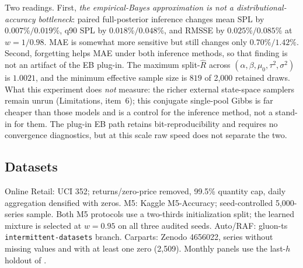 \documentclass[twocolumn,10pt]{article}
\theoremstyle{definition}
\begin{document}
Two readings. First, \emph{the empirical-Bayes approximation is not a
distributional-accuracy bottleneck}: paired full-posterior inference changes
mean SPL by $0.007\%/0.019\%$, q90 SPL by $0.018\%/0.048\%$, and RMSSE by
$0.025\%/0.085\%$ at $w=1/0.98$. MAE is somewhat more sensitive but still
changes only $0.70\%/1.42\%$. Second, forgetting helps MAE under both
inference methods, so that finding is not an artifact of the EB plug-in.
The maximum split-$\widehat R$ across $(\alpha,\beta,\mu_0,\tau^2,\sigma^2)$
is $1.0021$, and the minimum effective sample size is $819$ of 2{,}000
retained draws.
What this experiment does \emph{not} measure: the richer external
state-space samplers
\citep{chapados2014,seeger2016} remain unrun (Limitations, item~6); this
conjugate single-pool Gibbs is far cheaper than those models and is a
control for the inference method, not a stand-in for them. The plug-in
EB path retains bit-reproducibility and requires no convergence
diagnostics, but at this scale raw speed does not separate the two.

\subsection{Datasets}\label{app:datasets}
Online Retail: UCI 352; returns/zero-price removed, 99.5\% quantity cap,
daily aggregation densified with zeros. M5: Kaggle M5-Accuracy;
seed-controlled 5{,}000-series sample. Both M5 protocols use a two-thirds
initialization split; the learned mixture is selected at $w=0.95$ on all
three audited seeds. Auto/RAF: gluon-ts
\texttt{intermittent-datasets} branch. Carparts: Zenodo 4656022, series
without missing values and with at least one zero (2{,}509). Monthly
panels use the last-$h$ holdout of \citet{damato2025}.
\end{document}

